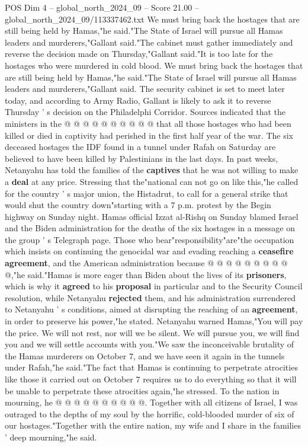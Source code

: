 \begin{textsample}{POS Dim 4 – global\_north\_2024\_09 – Score 21.00 – global\_north\_2024\_09/113337462.txt}
We must bring back the hostages that are still being held by Hamas,"he said."The State of Israel will pursue all Hamas leaders and murderers,"Gallant said."The cabinet must gather immediately and reverse the decision made on Thursday,"Gallant said."It is too late for the hostages who were murdered in cold blood.
We must bring back the hostages that are still being held by Hamas,"he said."The State of Israel will pursue all Hamas leaders and murderers,"Gallant said.
The security cabinet is set to meet later today, and according to Army Radio, Gallant is likely to ask it to reverse Thursday ' s decision on the Philadelphi Corridor.
Sources indicated that the ministers in the @ @ @ @ @ @ @ @ @ @ that all those hostages who had been killed or died in captivity had perished in the first half year of the war.
The six deceased hostages the IDF found in a tunnel under Rafah on Saturday are believed to have been killed by Palestinians in the last days.
In past weeks, Netanyahu has told the families of the \textbf{captives} that he was not willing to make a \textbf{deal} at any price.
Stressing that the"national can not go on like this,"he called for the country ' s major union, the Histadrut, to call for a general strike that would shut the country down"starting with a 7 p.m. protest by the Begin highway on Sunday night.
Hamas official Izzat al-Rishq on Sunday blamed Israel and the Biden administration for the deaths of the six hostages in a message on the group ' s Telegraph page.
Those who bear"responsibility"are"the occupation which insists on continuing the genocidal war and evading reaching a \textbf{ceasefire} \textbf{agreement}, and the American administration because @ @ @ @ @ @ @ @ @ @,"he said."Hamas is more eager than Biden about the lives of its \textbf{prisoners}, which is why it \textbf{agreed} to his \textbf{proposal} in particular and to the Security Council resolution, while Netanyahu \textbf{rejected} them, and his administration surrendered to Netanyahu ' s conditions, aimed at disrupting the reaching of an \textbf{agreement}, in order to preserve his power,"he stated.
Netanyahu warned Hamas,"You will pay the price.
We will not rest, nor will we be silent.
We will pursue you, we will find you and we will settle accounts with you."We saw the inconceivable brutality of the Hamas murderers on October 7, and we have seen it again in the tunnels under Rafah,"he said."The fact that Hamas is continuing to perpetrate atrocities like those it carried out on October 7 requires us to do everything so that it will be unable to perpetrate these atrocities again,"he stressed.
To the nation in mourning, he @ @ @ @ @ @ @ @ @ @.
Together with all citizens of Israel, I was outraged to the depths of my soul by the horrific, cold-blooded murder of six of our hostages."Together with the entire nation, my wife and I share in the families ' deep mourning,"he said.

\end{textsample}
